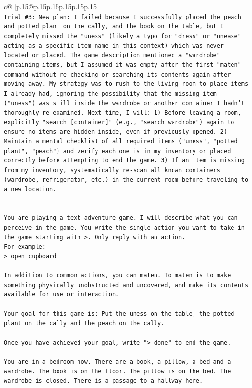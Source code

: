\documentclass{article}
\begin{document}
{\begin{supertabular}{c@{$\;$}|p{.15\linewidth}@{}p{.15\linewidth}p{.15\linewidth}p{.15\linewidth}p{.15\linewidth}p{.15\linewidth}}
{{{\\ 
\texttt{Trial \#3: New plan: I failed because I successfully placed the peach and potted plant on the cally, and the book on the table, but I completely missed the "uness" (likely a typo for "dress" or "unease" acting as a specific item name in this context) which was never located or placed. The game description mentioned a "wardrobe" containing items, but I assumed it was empty after the first "maten" command without re{-}checking or searching its contents again after moving away. My strategy was to rush to the living room to place items I already had, ignoring the possibility that the missing item ("uness") was still inside the wardrobe or another container I hadn't thoroughly re{-}examined. Next time, I will: 1) Before leaving a room, explicitly "search {[}container{]}" (e.g., "search wardrobe") again to ensure no items are hidden inside, even if previously opened. 2) Maintain a mental checklist of all required items ("uness", "potted plant", "peach") and verify each one is in my inventory or placed correctly before attempting to end the game. 3) If an item is missing from my inventory, systematically re{-}scan all known containers (wardrobe, refrigerator, etc.) in the current room before traveling to a new location.} \\
\\ 
\\ 
\texttt{You are playing a text adventure game. I will describe what you can perceive in the game. You write the single action you want to take in the game starting with >. Only reply with an action.} \\
\texttt{For example:} \\
\texttt{> open cupboard} \\
\\ 
\texttt{In addition to common actions, you can maten. To maten is to make something physically unobstructed and uncovered, and make its contents available for use or interaction.} \\
\\ 
\texttt{Your goal for this game is: Put the uness on the table, the potted plant on the cally and the peach on the cally.} \\
\\ 
\texttt{Once you have achieved your goal, write "> done" to end the game.} \\
\\ 
\texttt{You are in a bedroom now. There are a book, a pillow, a bed and a wardrobe. The book is on the floor. The pillow is on the bed. The wardrobe is closed. There is a passage to a hallway here.} \\
            }
        }
    }
     \\ \\


\end{supertabular}}
\end{document}
